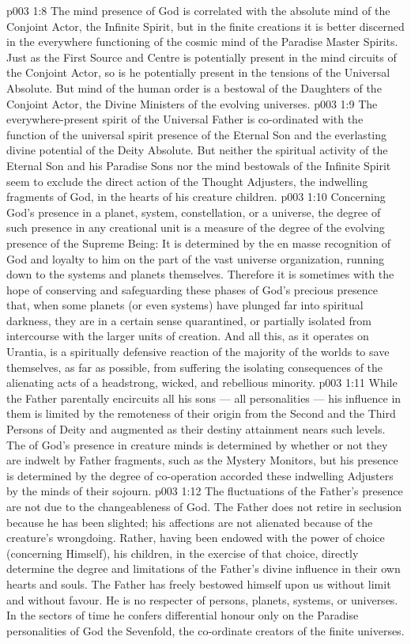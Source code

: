 \vs p003 1:8 The mind presence of God is correlated with the absolute mind of the Conjoint Actor, the Infinite Spirit, but in the finite creations it is better discerned in the everywhere functioning of the cosmic mind of the Paradise Master Spirits. Just as the First Source and Centre is potentially present in the mind circuits of the Conjoint Actor, so is he potentially present in the tensions of the Universal Absolute. But mind of the human order is a bestowal of the Daughters of the Conjoint Actor, the Divine Ministers of the evolving universes.
\vs p003 1:9 The everywhere\hyp{}present spirit of the Universal Father is co\hyp{}ordinated with the function of the universal spirit presence of the Eternal Son and the everlasting divine potential of the Deity Absolute. But neither the spiritual activity of the Eternal Son and his Paradise Sons nor the mind bestowals of the Infinite Spirit seem to exclude the direct action of the Thought Adjusters, the indwelling fragments of God, in the hearts of his creature children.
\vs p003 1:10 Concerning God’s presence in a planet, system, constellation, or a universe, the degree of such presence in any creational unit is a measure of the degree of the evolving presence of the Supreme Being: It is determined by the en masse recognition of God and loyalty to him on the part of the vast universe organization, running down to the systems and planets themselves. Therefore it is sometimes with the hope of conserving and safeguarding these phases of God’s precious presence that, when some planets (or even systems) have plunged far into spiritual darkness, they are in a certain sense quarantined, or partially isolated from intercourse with the larger units of creation. And all this, as it operates on Urantia, is a spiritually defensive reaction of the majority of the worlds to save themselves, as far as possible, from suffering the isolating consequences of the alienating acts of a headstrong, wicked, and rebellious minority.
\vs p003 1:11 \pc While the Father parentally encircuits all his sons --- all personalities --- his influence in them is limited by the remoteness of their origin from the Second and the Third Persons of Deity and augmented as their destiny attainment nears such levels. The  of God’s presence in creature minds is determined by whether or not they are indwelt by Father fragments, such as the Mystery Monitors, but his  presence is determined by the degree of co\hyp{}operation accorded these indwelling Adjusters by the minds of their sojourn.
\vs p003 1:12 The fluctuations of the Father’s presence are not due to the changeableness of God. The Father does not retire in seclusion because he has been slighted; his affections are not alienated because of the creature’s wrongdoing. Rather, having been endowed with the power of choice (concerning Himself), his children, in the exercise of that choice, directly determine the degree and limitations of the Father’s divine influence in their own hearts and souls. The Father has freely bestowed himself upon us without limit and without favour. He is no respecter of persons, planets, systems, or universes. In the sectors of time he confers differential honour only on the Paradise personalities of God the Sevenfold, the co\hyp{}ordinate creators of the finite universes.
